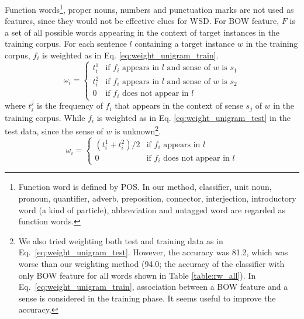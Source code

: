\documentclass[english]{jnlp_1.4}
\begin{document}
Function words\footnote{Function word is defined by POS. 
In our method, 
classifier, 
unit noun, 
pronoun, 
quantifier, 
adverb, 
preposition, 
connector, 
interjection, 
introductory word (a kind of particle), 
abbreviation 
and untagged word
are regarded as function words.
},
proper nouns, numbers and punctuation marks are not used as features, 
since they would not be effective clues for WSD.
For BOW feature, $F$ is a set of all possible words appearing in the context of target instances in the training corpus. 
For each sentence $l$ containing a target instance $w$ in the training corpus, $f_{i}$ is weighted as in Eq. \eqref{eq:weight_unigram_train}.
\begin{equation}\label{eq:weight_unigram_train}
\omega_{i} = \left \{ \begin{array}{ll} t_i^1 & \mbox{if $f_{i}$ appears in $l$ and sense of $w$ is $s_{1}$}\\ t_i^2 & \mbox{if $f_{i}$ appears in $l$ and sense of $w$ is $s_{2}$} \\ 0 & \mbox{if $f_{i}$ does not appear in $l$} \end{array} \right.
\end{equation}
where $t_i^j$ is the frequency of $f_i$ that appears in the context of sense $s_{j}$ of $w$ in the training corpus.
While $f_i$ is weighted as in Eq. \eqref{eq:weight_unigram_test} in the test data,
since the sense of $w$ is unknown\footnote{
	We also tried weighting both test and training data as in Eq.~\eqref{eq:weight_unigram_test}. However, the accuracy was 81.2, which was worse than our weighting method (94.0; the accuracy of the classifier with only BOW feature for all words shown in Table \ref{table:rw_all}). In Eq.~\eqref{eq:weight_unigram_train}, association between a BOW feature and a sense is considered in the training phase. It seems useful to improve the accuracy.}.
\begin{equation}\label{eq:weight_unigram_test}
\omega_{i} = \left \{ \begin{array}{ll} (t_i^1 + t_i^2)/2 & \mbox{if $f_{i}$ appears in $l$} \\ 
0 & \mbox{if $f_{i}$ does not appear in $l$} \end{array} \right.
\end{equation}
\end{document}
